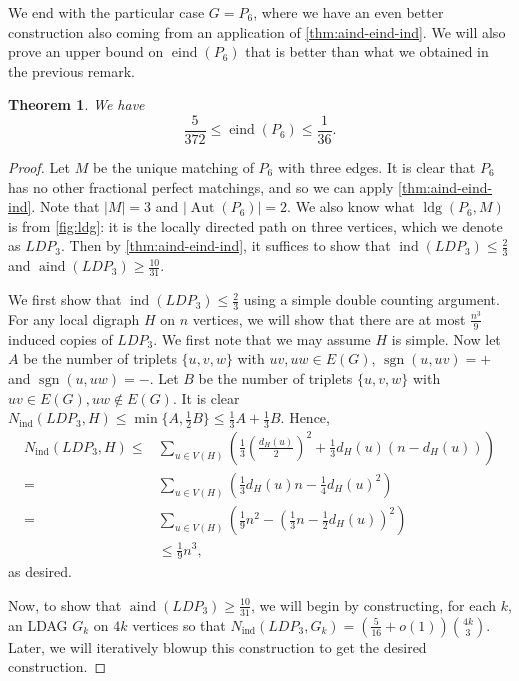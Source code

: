\documentclass[reqno,11pt]{amsart}
\numberwithin{equation}{section}
\newtheorem{theorem}{Theorem}[section]
\theoremstyle{definition}
\theoremstyle{remark}
\newcommand{\abs}[1]{\left\lvert#1\right\rvert}
\DeclareMathOperator{\sgn}{sgn}
\DeclareMathOperator{\ind}{ind}
\DeclareMathOperator{\eind}{eind}
\DeclareMathOperator{\aind}{aind}
\DeclareMathOperator{\ldg}{ldg}
\DeclareMathOperator{\Aut}{Aut}
\begin{document}
We end with the particular case $G=P_6$, where we have an even better construction also coming from an application of \cref{thm:aind-eind-ind}.
We will also prove an upper bound on $\eind(P_6)$ that is better than what we obtained in the previous remark.


\begin{theorem}\label{thm:P6}
    We have
    \[\frac{5}{372}\leq \eind(P_6) \leq \frac{1}{36}.\]
\end{theorem}
\begin{proof}
    Let $M$ be the unique matching of $P_6$ with three edges.
    It is clear that $P_6$ has no other fractional perfect matchings, and so we can apply \cref{thm:aind-eind-ind}.
    Note that $\abs{M} = 3$ and $\abs{\Aut(P_6)}=2$.
    We also know what $\ldg(P_6,M)$ is from \cref{fig:ldg}: it is the locally directed path on three vertices, which we denote as $LDP_3$.
    Then by \cref{thm:aind-eind-ind}, it suffices to show that $\ind(LDP_3)\leq\frac{2}{3}$ and $\aind(LDP_3)\geq \frac{10}{31}$.

    We first show that $\ind(LDP_3)\leq \frac{2}{3}$ using a simple double counting argument.
    For any local digraph $H$ on $n$ vertices, we will show that there are at most $\frac{n^3}{9}$ induced copies of $LDP_3$.
    We first note that we may assume $H$ is simple.
    Now let $A$ be the number of triplets $\{u,v,w\}$ with $uv,uw\in E(G)$, $\sgn(u,uv)=+$ and $\sgn(u,uw)=-$.
    Let $B$ be the number of triplets $\{u,v,w\}$ with $uv\in E(G), uw\not\in E(G)$.
    It is clear $N_{\ind}(LDP_3,H)\leq \min\{A,\frac{1}{2}B\}\leq \frac{1}{3}A+\frac{1}{3}B$.
    Hence,
    \begin{align*}
        N_{\ind}(LDP_3,H)\leq &\sum_{u\in V(H)}\left(\frac{1}{3}\left(\frac{d_H(u)}{2}\right)^2+\frac{1}{3}d_H(u)(n-d_H(u))\right)\\ = &\sum_{u\in V(H)}\left(\frac{1}{3}d_H(u)n-\frac{1}{4}d_H(u)^2\right)\\ =&\sum_{u\in V(H)}\left(\frac{1}{9}n^2-\left(\frac{1}{3}n-\frac{1}{2}d_H(u)\right)^2\right)\\
        &\leq \frac{1}{9}n^3,
    \end{align*}
    as desired.

    Now, to show that $\aind(LDP_3)\geq \frac{10}{31}$, we will begin by constructing, for each $k$, an LDAG $G_k$ on $4k$ vertices so that $N_{\ind}(LDP_3,G_k)= (\frac{5}{16}+o(1))\binom{4k}{3}$.
    Later, we will iteratively blowup this construction to get the desired construction.
    

\end{proof}
\end{document}
